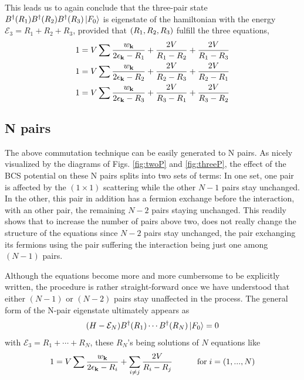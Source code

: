 \documentclass[aps,prb,amsmath,amssymb,preprint,superscriptaddress]{revtex4-1}
\newcommand{\fo}{\ensuremath{\ket{F_0}}}
\renewcommand{\E}{\ensuremath{\mathcal{E}}}
\begin{document}
This leads us to again conclude that the three-pair state $B^{\dagger}(R_1)B^{\dagger}(R_2)B^{\dagger}(R_3)\fo$ is eigenstate of the hamiltonian with the energy $\E_3=R_1+R_2+R_3$, provided that $\left(R_1,R_2, R_3\right)$ fulfill the three equations, 
\begin{equation}
\begin{split}
1&=V\sum\frac{w_{\mathbf{k}}}{2\epsilon_{\mathbf{k}}-R_1}+\frac{2V}{R_1-R_2}+\frac{2V}{R_1-R_3}\\
1&=V\sum\frac{w_{\mathbf{k}}}{2\epsilon_{\mathbf{k}}-R_2}+\frac{2V}{R_2-R_3}+\frac{2V}{R_2-R_1}\\
1&=V\sum\frac{w_{\mathbf{k}}}{2\epsilon_{\mathbf{k}}-R_3}+\frac{2V}{R_3-R_1}+\frac{2V}{R_3-R_2}
\end{split}
\end{equation}

\subsection{N pairs}
The above commutation technique can be easily generated to N pairs. As nicely visualized by the diagrams of Figs. \ref{fig:twoP} and \ref{fig:threeP}, the effect of the BCS potential on these N pairs splits into two sets of terms: In one set, one pair is affected by the $(1\times1)$ scattering while the other $N-1$ pairs stay unchanged. In the other, this pair in addition has a fermion exchange before the interaction, with an other pair, the remaining $N-2$ pairs staying unchanged. This readily shows that to increase the  number of pairs above two, does not really change the structure of the equations since $N-2$ pairs stay unchanged, the pair exchanging its fermions using the pair suffering the interaction  being just one among $(N-1)$ pairs. 

Although the equations become more and more cumbersome to be explicitly written, the procedure is rather straight-forward once we have understood that either $(N-1)$ or $(N-2)$ pairs stay unaffected in the process.  The general form of the N-pair eigenstate ultimately appears as 
\begin{equation}\label{eq:SchThreeN}
(H-\E_N)B^{\dagger}(R_1)\cdots{}B^{\dagger}(R_N)\fo=0
\end{equation}
with $\E_3=R_1+\cdots+R_N$, these $R_N$'s being  solutions of $N$ equations like
\begin{equation}
1=V\sum\frac{w_{\mathbf{k}}}{2\epsilon_{\mathbf{k}}-R_i}+\sum_{i\neq{j}}\frac{2V}{R_i-R_j}\quad\qquad \text{for}\; i=\left(1,...,N\right)
\end{equation}
\end{document}
